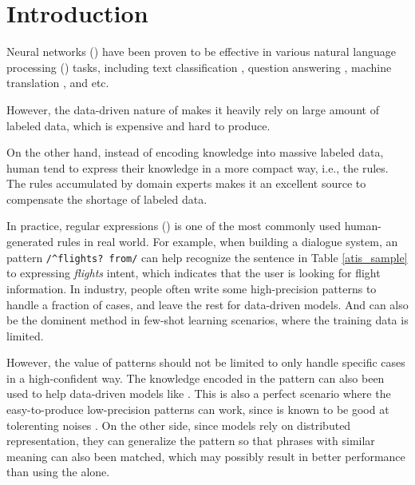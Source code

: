 \section{Introduction}

Neural networks (\NN) have been proven to be effective in various natural language processing (\NLP) tasks, including text classification \cite{kim2014convolutional}, question answering \cite{yih2015semantic}, machine translation \cite{bahdanau2014neural}, and etc.

However, the data-driven nature of \NN makes it heavily rely on large amount of labeled data, which is expensive and hard to produce.

On the other hand, instead of encoding knowledge into massive labeled data, human tend to express their knowledge in a more compact way, i.e., the rules. The rules accumulated by domain experts makes it an excellent source to compensate the shortage of labeled data.

In practice, regular expressions (\RE) is one of the most commonly used human-generated rules in real world. 
For example, when building a dialogue system, an \RE pattern \texttt{/\textasciicircum flights? from/} can help recognize the sentence in Table \ref{atis_sample} to expressing \emph{flights} intent, which indicates that the user is looking for flight information.
In industry, people often write some high-precision \RE patterns to handle a fraction of cases, and leave the rest for data-driven models. And \RE can also be the dominent method in few-shot learning scenarios, where the training data is limited.

However, the value of \RE patterns should not be limited to only handle specific cases in a high-confident way. The knowledge encoded in the pattern can also been used to help data-driven models like \NN. 
This is also a perfect scenario where the easy-to-produce low-precision patterns can work, since \NN is known to be good at tolerenting noises \cite{srivastava2014dropout, xie2016disturblabel}.
On the other side, since \NN models rely on distributed representation, they can generalize the \RE pattern so that phrases with similar meaning can also been matched, which may possibly result in better performance than using the \RE alone.

